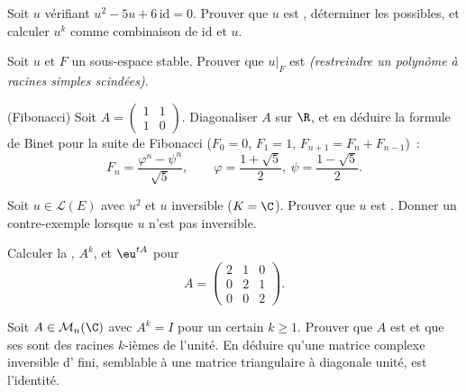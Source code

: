 \begin{exercise}[$\star$]\label{exo:b2:reduction:3}
Soit $u$ vérifiant $u^2 - 5u + 6\,\mathrm{id} = 0$. Prouver que $u$
est , déterminer les  possibles, et calculer
$u^k$ comme combinaison de $\mathrm{id}$ et $u$.
\end{exercise}

\begin{exercise}[$\star\star$]\label{exo:b2:reduction:4}
Soit $u$  et $F$ un sous-espace stable. Prouver que
$u|_F$ est  \emph{(restreindre un polynôme  à
racines simples scindées)}.
\end{exercise}

\begin{exercise}[$\star\star$]\label{exo:b2:reduction:5}
(Fibonacci) Soit $A = \begin{pmatrix} 1 & 1\\ 1 & 0\end{pmatrix}$.
Diagonaliser $A$ sur $\R$, et en déduire la formule de Binet pour la
suite de Fibonacci ($F_0 = 0$, $F_1 = 1$, $F_{n+1} = F_n +
F_{n-1}$)~:
\[
F_n = \frac{\varphi^n - \psi^n}{\sqrt 5},
\qquad \varphi = \frac{1 + \sqrt5}{2},\ \psi = \frac{1 -
\sqrt5}{2}.
\]
\end{exercise}

\begin{exercise}[$\star\star$]\label{exo:b2:reduction:6}
Soit $u \in \mathcal{L}(E)$ avec $u^2$  et $u$
inversible ($K = \C$). Prouver que $u$ est . Donner un
contre-exemple lorsque $u$ n'est pas inversible.
\end{exercise}

\begin{exercise}[$\star\star$]\label{exo:b2:reduction:7}
Calculer la , $A^k$, et $\eu^{tA}$ pour
\[
A = \begin{pmatrix} 2 & 1 & 0\\ 0 & 2 & 1\\ 0 & 0 & 2
\end{pmatrix}.
\]
\end{exercise}

\begin{exercise}[$\star\star$]\label{exo:b2:reduction:8}
Soit $A \in \mathcal{M}_n(\C)$ avec $A^k = I$ pour un certain $k \geq
1$. Prouver que $A$ est  et que ses  sont
des racines $k$-ièmes de l'unité. En déduire qu'une matrice complexe
inversible d' fini, semblable à une matrice triangulaire à
diagonale unité, est l'identité.
\end{exercise}

